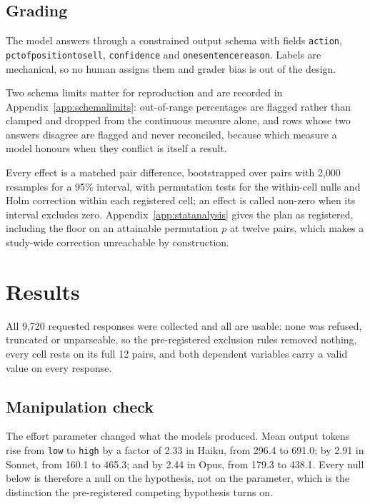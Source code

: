\subsection{Grading}
The model answers through a constrained output schema with fields
\texttt{action}, \texttt{pct\us of\us position\us to\us sell}, \texttt{confidence}
and \texttt{one\us sentence\us reason}. Labels are mechanical, so no human
assigns them and grader bias is out of the design.

\ifsubmission
Two schema limits matter for reproduction and are recorded in
Appendix~\ref{app:schemalimits}: out-of-range percentages are flagged rather
than clamped and dropped from the continuous measure alone, and rows whose
two answers disagree are flagged and never reconciled, because which measure
a model honours when they conflict is itself a result.
\else

\fi

\ifsubmission
Every effect is a matched pair difference, bootstrapped over pairs with
2{,}000 resamples for a 95\% interval, with permutation tests for the
within-cell nulls and Holm correction within each registered cell; an effect
is called non-zero when its interval excludes zero.
Appendix~\ref{app:statanalysis} gives the plan as registered, including the
floor on an attainable permutation $p$ at twelve pairs, which makes a
study-wide correction unreachable by construction.
\else

\fi

\section{Results}
\label{sec:results}
All 9{,}720 requested responses were collected and all are usable: none was
refused, truncated or unparseable, so the pre-registered exclusion rules
removed nothing, every cell rests on its full 12 pairs, and both dependent
variables carry a valid value on every response.

\subsection{Manipulation check}
The effort parameter changed what the models produced. Mean output tokens
rise from \texttt{low} to \texttt{high} by a factor of 2.33 in Haiku, from
296.4 to 691.0; by 2.91 in Sonnet, from 160.1 to 465.3; and by 2.44 in Opus,
from 179.3 to 438.1. Every null below is therefore a null on the hypothesis,
not on the parameter, which is the distinction the pre-registered competing
hypothesis turns on.

